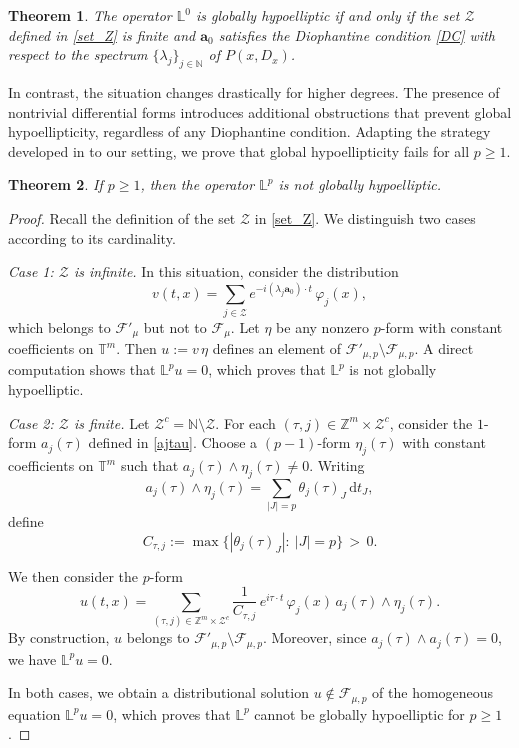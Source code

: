 \documentclass[12pt,reqno]{amsart}
\newtheorem{theorem}{Theorem}[section]
\theoremstyle{definition}
\numberwithin{equation}{section}
\begin{document}
\begin{theorem}\label{hypo0}
	The operator $\mathbb{L}^0$ is globally hypoelliptic if and only if
	the set $\mathcal{Z}$ defined in \eqref{set_Z} is finite and
	$\boldsymbol{a}_0$ satisfies the Diophantine condition \eqref{DC}
	with respect to the spectrum $\{\lambda_j\}_{j\in\mathbb{N}}$
	of $P(x,D_x)$.
\end{theorem}

In contrast, the situation changes drastically for higher degrees.
The presence of nontrivial differential forms introduces additional
obstructions that prevent global hypoellipticity, regardless of any
Diophantine condition.
Adapting the strategy developed in \cite{DatMez20} to our setting, we prove
that global hypoellipticity fails for all $p \ge 1$.

\begin{theorem}\label{hypo>0}
	If $p \ge 1$, then the operator $\mathbb{L}^p$ is not globally
	hypoelliptic.
\end{theorem}

\begin{proof}
	Recall the definition of the set $\mathcal{Z}$ in \eqref{set_Z}.
	We distinguish two cases according to its cardinality.
	
	\smallskip
	\noindent\emph{Case 1: $\mathcal{Z}$ is infinite.}
	In this situation, consider the distribution
	\[
	v(t,x)
	=
	\sum_{j\in\mathcal{Z}}
	e^{-i(\lambda_j\boldsymbol{a}_0)\cdot t}\,\varphi_j(x),
	\]
	which belongs to $\mathscr{F}'_\mu$ but not to $\mathscr{F}_\mu$.
	Let $\eta$ be any nonzero $p$-form with constant coefficients on
	$\mathbb{T}^m$.
	Then $u := v\,\eta$ defines an element of
	$\mathscr{F}'_{\mu,p}\setminus\mathscr{F}_{\mu,p}$.
	A direct computation shows that $\mathbb{L}^p u = 0$,
	which proves that $\mathbb{L}^p$ is not globally hypoelliptic.
	
	\smallskip
	\noindent\emph{Case 2: $\mathcal{Z}$ is finite.}
	Let $\mathcal{Z}^c = \mathbb{N}\setminus\mathcal{Z}$.
	For each $(\tau,j)\in\mathbb{Z}^m\times\mathcal{Z}^c$, consider the
	$1$-form $a_j(\tau)$ defined in \eqref{ajtau}.
	Choose a $(p-1)$-form $\eta_j(\tau)$ with constant coefficients on
	$\mathbb{T}^m$ such that
	$a_j(\tau)\wedge\eta_j(\tau)\neq 0$.
	Writing
	\[
	a_j(\tau)\wedge\eta_j(\tau)
	=
	\sum_{|J|=p}\theta_j(\tau)_J\,\mathrm{d}t_J,
	\]
	define
	\[
	C_{\tau,j}
	:=
	\max\{|\theta_j(\tau)_J|:\ |J|=p\}
	\,>\,0.
	\]
	
	We then consider the $p$-form
	\[
	u(t,x)
	=
	\sum_{(\tau,j)\in\mathbb{Z}^m\times\mathcal{Z}^c}
	\frac{1}{C_{\tau,j}}\,
	e^{i\tau\cdot t}\,\varphi_j(x)\,
	a_j(\tau)\wedge\eta_j(\tau).
	\]
	By construction, $u$ belongs to
	$\mathscr{F}'_{\mu,p}\setminus\mathscr{F}_{\mu,p}$.
	Moreover, since $a_j(\tau)\wedge a_j(\tau)=0$, we have
	$\mathbb{L}^p u = 0$.
	
	In both cases, we obtain a distributional solution $u\notin
	\mathscr{F}_{\mu,p}$ of the homogeneous equation
	$\mathbb{L}^p u = 0$, which proves that $\mathbb{L}^p$ cannot be
	globally hypoelliptic for $p\ge1$.
\end{proof}
\end{document}
